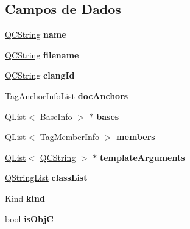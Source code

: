 \subsection*{Campos de Dados}
\begin{DoxyCompactItemize}
\item 
\hypertarget{class_tag_class_info_adc0097c7bd1e61ad32058fcde425bc7a}{\hyperlink{class_q_c_string}{Q\-C\-String} {\bfseries name}}\label{class_tag_class_info_adc0097c7bd1e61ad32058fcde425bc7a}

\item 
\hypertarget{class_tag_class_info_a99a47216e8094a3186f3d837ee0b1c25}{\hyperlink{class_q_c_string}{Q\-C\-String} {\bfseries filename}}\label{class_tag_class_info_a99a47216e8094a3186f3d837ee0b1c25}

\item 
\hypertarget{class_tag_class_info_a9adedad08b4182d4cb771d92bac11fcc}{\hyperlink{class_q_c_string}{Q\-C\-String} {\bfseries clang\-Id}}\label{class_tag_class_info_a9adedad08b4182d4cb771d92bac11fcc}

\item 
\hypertarget{class_tag_class_info_a3a6c53fe1869a01e3748ec5898a54458}{\hyperlink{class_tag_anchor_info_list}{Tag\-Anchor\-Info\-List} {\bfseries doc\-Anchors}}\label{class_tag_class_info_a3a6c53fe1869a01e3748ec5898a54458}

\item 
\hypertarget{class_tag_class_info_a772be92d4acacae593976d36b7970fea}{\hyperlink{class_q_list}{Q\-List}$<$ \hyperlink{struct_base_info}{Base\-Info} $>$ $\ast$ {\bfseries bases}}\label{class_tag_class_info_a772be92d4acacae593976d36b7970fea}

\item 
\hypertarget{class_tag_class_info_acab433535ad1575dfbddf6796d2baf98}{\hyperlink{class_q_list}{Q\-List}$<$ \hyperlink{class_tag_member_info}{Tag\-Member\-Info} $>$ {\bfseries members}}\label{class_tag_class_info_acab433535ad1575dfbddf6796d2baf98}

\item 
\hypertarget{class_tag_class_info_a01a6832bb0d78b757d670695cb5b41e3}{\hyperlink{class_q_list}{Q\-List}$<$ \hyperlink{class_q_c_string}{Q\-C\-String} $>$ $\ast$ {\bfseries template\-Arguments}}\label{class_tag_class_info_a01a6832bb0d78b757d670695cb5b41e3}

\item 
\hypertarget{class_tag_class_info_af3bb2d0ed4b98f17279d80fdf29f77cb}{\hyperlink{class_q_string_list}{Q\-String\-List} {\bfseries class\-List}}\label{class_tag_class_info_af3bb2d0ed4b98f17279d80fdf29f77cb}

\item 
\hypertarget{class_tag_class_info_ad4f6a38e725118afcde5fbb91ccbbb12}{Kind {\bfseries kind}}\label{class_tag_class_info_ad4f6a38e725118afcde5fbb91ccbbb12}

\item 
\hypertarget{class_tag_class_info_a0ffb4089c7f95fffe974091e03c6524c}{bool {\bfseries is\-Obj\-C}}\label{class_tag_class_info_a0ffb4089c7f95fffe974091e03c6524c}

\end{DoxyCompactItemize}



